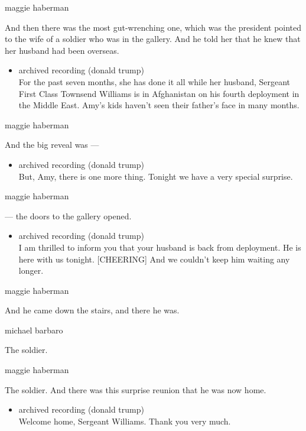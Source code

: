 maggie haberman

And then there was the most gut-wrenching one, which was the president
pointed to the wife of a soldier who was in the gallery. And he told her
that he knew that her husband had been overseas.

\begin{itemize}
\tightlist
\item
  archived recording (donald trump)\\
  For the past seven months, she has done it all while her husband,
  Sergeant First Class Townsend Williams is in Afghanistan on his fourth
  deployment in the Middle East. Amy's kids haven't seen their father's
  face in many months.
\end{itemize}

maggie haberman

And the big reveal was ---

\begin{itemize}
\tightlist
\item
  archived recording (donald trump)\\
  But, Amy, there is one more thing. Tonight we have a very special
  surprise.
\end{itemize}

maggie haberman

--- the doors to the gallery opened.

\begin{itemize}
\tightlist
\item
  archived recording (donald trump)\\
  I am thrilled to inform you that your husband is back from deployment.
  He is here with us tonight. {[}CHEERING{]} And we couldn't keep him
  waiting any longer.
\end{itemize}

maggie haberman

And he came down the stairs, and there he was.

michael barbaro

The soldier.

maggie haberman

The soldier. And there was this surprise reunion that he was now home.

\begin{itemize}
\tightlist
\item
  archived recording (donald trump)\\
  Welcome home, Sergeant Williams. Thank you very much.
\end{itemize}

